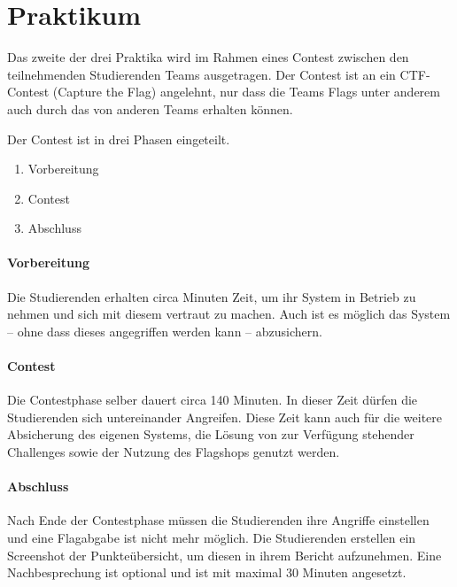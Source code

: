\section{Praktikum }
\label{sec:Praktikum}

Das zweite der drei Praktika  wird im Rahmen eines Contest zwischen den teilnehmenden Studierenden Teams ausgetragen. Der Contest ist an ein CTF-Contest (Capture the Flag) angelehnt, nur dass die Teams Flags unter anderem auch durch das  von anderen Teams erhalten können.

Der Contest ist in drei Phasen eingeteilt.
\begin{enumerate}
	\item Vorbereitung
	\item Contest
	\item Abschluss
\end{enumerate}

\paragraph{Vorbereitung}\label{para:Vorbereitung}
Die Studierenden erhalten circa Minuten Zeit, um ihr System in Betrieb zu nehmen und sich mit diesem vertraut zu machen. Auch ist es möglich das System – ohne dass dieses angegriffen werden kann – abzusichern.

\paragraph{Contest}\label{para:Contest}
Die Contestphase selber dauert circa 140 Minuten. In dieser Zeit dürfen die Studierenden sich untereinander Angreifen. Diese Zeit kann auch für die weitere Absicherung des eigenen Systems, die Lösung von zur Verfügung stehender Challenges sowie der Nutzung des Flagshops genutzt werden.

\paragraph{Abschluss}\label{para:Abschluss}
Nach Ende der Contestphase müssen die Studierenden ihre Angriffe einstellen und eine Flagabgabe ist nicht mehr möglich. Die Studierenden erstellen ein Screenshot der Punkteübersicht, um diesen in ihrem Bericht aufzunehmen. Eine Nachbesprechung ist optional und ist mit maximal 30 Minuten angesetzt.

